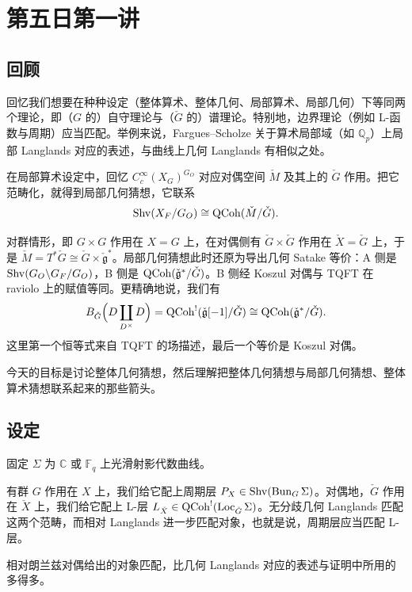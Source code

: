 \section{第五日第一讲}

\subsection{回顾}

回忆我们想要在种种设定（整体算术、整体几何、局部算术、局部几何）下等同两个理论，即（$G$ 的）自守理论与（$\check G$ 的）谱理论。特别地，边界理论（例如 L-函数与周期）应当匹配。举例来说，Fargues--Scholze 关于算术局部域（如 $\mathbb Q_p$）上局部 Langlands 对应的表述，与曲线上几何 Langlands 有相似之处。

在局部算术设定中，回忆 $C_c^\infty(X_G)^{G_O}$ 对应对偶空间 $\check M$ 及其上的 $\check G$ 作用。把它范畴化，就得到局部几何猜想，它联系
\[
  \operatorname{Shv}(X_F/G_O)\cong\operatorname{QCoh}(\check M/\check G).
\]

\begin{exmp}
对群情形，即 $G\times G$ 作用在 $X=G$ 上，在对偶侧有 $\check G\times\check G$ 作用在 $\check X=\check G$ 上，于是 $\check M=T^*\check G\cong\check G\times\check{\mathfrak g}^*$。局部几何猜想此时还原为导出几何 Satake 等价：A 侧是 $\operatorname{Shv}(G_O\backslash G_F/G_O)$，B 侧是 $\operatorname{QCoh}(\check{\mathfrak g}^*/\check G)$。B 侧经 Koszul 对偶与 TQFT 在 raviolo 上的赋值等同。更精确地说，我们有
\[
  B_{\check G}\Big(D\coprod_{D^\times}D\Big)=\operatorname{QCoh}^!(\check{\mathfrak g}[-1]/\check G)\cong\operatorname{QCoh}(\check{\mathfrak g}^*/\check G).
\]
这里第一个恒等式来自 TQFT 的场描述，最后一个等价是 Koszul 对偶。
\end{exmp}

今天的目标是讨论整体几何猜想，然后理解把整体几何猜想与局部几何猜想、整体算术猜想联系起来的那些箭头。

\subsection{设定}

固定 $\Sigma$ 为 $\mathbb C$ 或 $\mathbb F_q$ 上光滑射影代数曲线。

有群 $G$ 作用在 $X$ 上，我们给它配上周期层 $P_X\in\operatorname{Shv}(\operatorname{Bun}_G\Sigma)$。对偶地，$\check G$ 作用在 $\check X$ 上，我们给它配上 L-层 $L_{\check X}\in\operatorname{QCoh}^!(\operatorname{Loc}_{\check G}\Sigma)$。无分歧几何 Langlands 匹配这两个范畴，而相对 Langlands 进一步匹配对象，也就是说，周期层应当匹配 L-层。

\begin{rem}
相对朗兰兹对偶给出的对象匹配，比几何 Langlands 对应的表述与证明中所用的多得多。
\end{rem}

